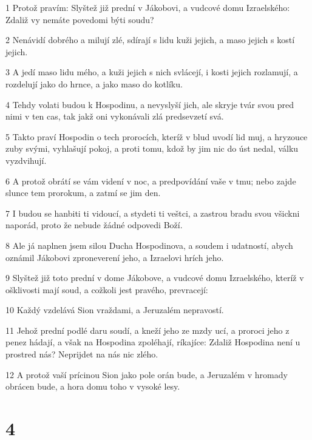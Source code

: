 \par 1 Protož pravím: Slyštež již prední v Jákobovi, a vudcové domu Izraelského: Zdaliž vy nemáte povedomi býti soudu?
\par 2 Nenávidí dobrého a milují zlé, sdírají s lidu kuži jejich, a maso jejich s kostí jejich.
\par 3 A jedí maso lidu mého, a kuži jejich s nich svlácejí, i kosti jejich rozlamují, a rozdelují jako do hrnce, a jako maso do kotlíku.
\par 4 Tehdy volati budou k Hospodinu, a nevyslyší jich, ale skryje tvár svou pred nimi v ten cas, tak jakž oni vykonávali zlá predsevzetí svá.
\par 5 Takto praví Hospodin o tech prorocích, kteríž v blud uvodí lid muj, a hryzouce zuby svými, vyhlašují pokoj, a proti tomu, kdož by jim nic do úst nedal, válku vyzdvihují.
\par 6 A protož obrátí se vám videní v noc, a predpovídání vaše v tmu; nebo zajde slunce tem prorokum, a zatmí se jim den.
\par 7 I budou se hanbiti ti vidoucí, a stydeti ti veštci, a zastrou bradu svou všickni naporád, proto že nebude žádné odpovedi Boží.
\par 8 Ale já naplnen jsem silou Ducha Hospodinova, a soudem i udatností, abych oznámil Jákobovi zproneverení jeho, a Izraelovi hrích jeho.
\par 9 Slyštež již toto prední v dome Jákobove, a vudcové domu Izraelského, kteríž v ošklivosti mají soud, a cožkoli jest pravého, prevracejí:
\par 10 Každý vzdelává Sion vraždami, a Jeruzalém nepravostí.
\par 11 Jehož prední podlé daru soudí, a kneží jeho ze mzdy ucí, a proroci jeho z penez hádají, a však na Hospodina zpoléhají, ríkajíce: Zdaliž Hospodina není u prostred nás? Neprijdet na nás nic zlého.
\par 12 A protož vaší prícinou Sion jako pole orán bude, a Jeruzalém v hromady obrácen bude, a hora domu toho v vysoké lesy.

\chapter{4}


